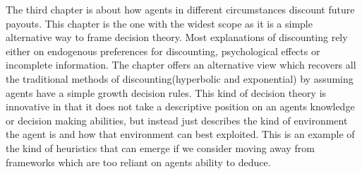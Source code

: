 \documentclass[12pt]{article}
\numberwithin{equation}{section}
\begin{document}
The third chapter is about how agents in different circumstances discount future payouts. This chapter is the one with the widest scope as it is a simple alternative way to frame decision theory. Most explanations of discounting rely either on endogenous preferences for discounting, psychological effects or incomplete information. The chapter offers an alternative view which recovers all the traditional methods of discounting(hyperbolic and exponential) by assuming agents have a simple growth decision rules. This kind of decision theory is innovative in that it does not take a descriptive position on an agents knowledge or decision making abilities, but instead just describes the kind of environment the agent is and how that environment can best exploited. This is an example of the kind of heuristics that can emerge if we consider moving away from frameworks which are too reliant on agents ability to deduce.







\end{document}
